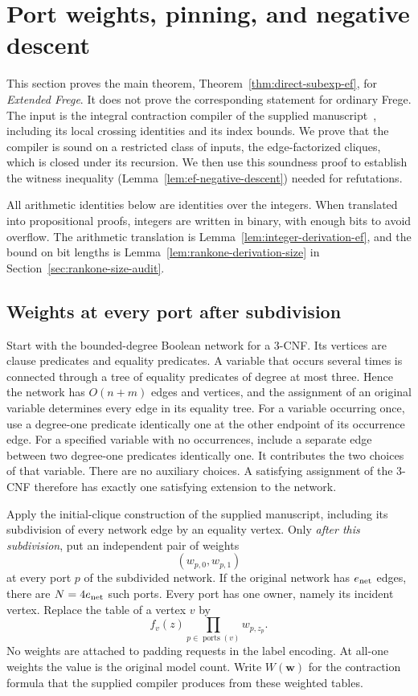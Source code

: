 \documentclass[11pt]{article}
\theoremstyle{definition}
\theoremstyle{remark}
\begin{document}
\section{Port weights, pinning, and negative descent}
\label{sec:direct-ef}

This section proves the main theorem, Theorem~\ref{thm:direct-subexp-ef},
for \emph{Extended Frege}. It does not prove the corresponding
statement for ordinary Frege. The input is the integral contraction
compiler of the supplied manuscript~\cite{cruz-ntime}, including its
local crossing identities and its index bounds. We prove that the
compiler is sound on a restricted class of inputs, the edge-factorized
cliques, which is closed under its recursion. We then use this
soundness proof to establish the witness inequality
(Lemma~\ref{lem:ef-negative-descent}) needed for refutations.

All arithmetic identities below are identities over the integers.
When translated into propositional proofs, integers are written in
binary, with enough bits to avoid overflow. The arithmetic translation
is Lemma~\ref{lem:integer-derivation-ef}, and the bound on bit lengths
is Lemma~\ref{lem:rankone-derivation-size} in
Section~\ref{sec:rankone-size-audit}.

\subsection{Weights at every port after subdivision}

Start with the bounded-degree Boolean network for a 3-CNF. Its vertices
are clause predicates and equality predicates. A variable that occurs
several times is connected through a tree of equality predicates of
degree at most three. Hence the network has $O(n+m)$ edges and vertices,
and the assignment of an original variable determines every edge in
its equality tree. For a variable occurring once, use a degree-one
predicate identically one at the other endpoint of its occurrence
edge. For a specified variable with no occurrences, include a separate
edge between two degree-one predicates identically one. It contributes
the two choices of that variable. There are no auxiliary choices. A satisfying
assignment of the 3-CNF therefore has exactly one satisfying extension
to the network.

Apply the initial-clique construction of the supplied manuscript,
including its subdivision of every network edge by an equality vertex.
Only \emph{after this subdivision}, put an independent pair of weights
\[
 (w_{p,0},w_{p,1})
\]
at every port $p$ of the subdivided network. If the original network has
$e_{\rm net}$ edges, there are $N=4e_{\rm net}$ such ports. Every port has one owner, namely
its incident vertex. Replace the table of a vertex $v$ by
\[
 f_v(z)\prod_{p\in\operatorname{ports}(v)}w_{p,z_p}.
 \tag{\thesection.1}\label{eq:port-weight-table}
\]
No weights are attached to padding requests in the label encoding.
At all-one weights the value is the original model count. Write
$W(\mathbf w)$ for the contraction formula that the supplied compiler
produces from these weighted tables.
\end{document}
